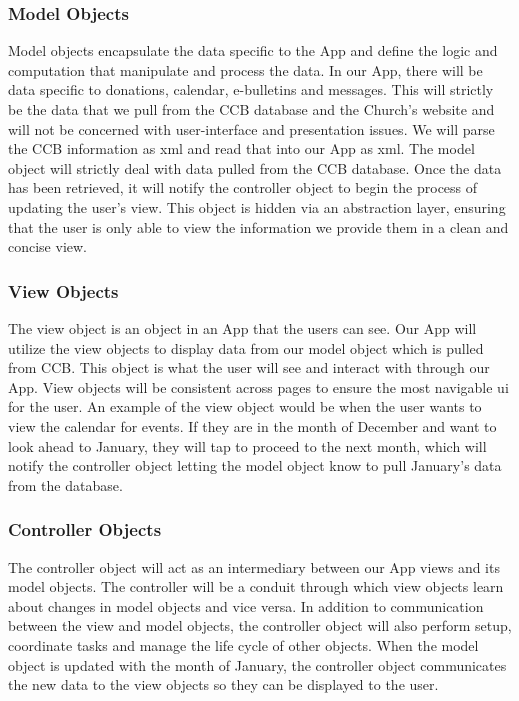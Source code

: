 \documentclass[letterpaper,10pt,draftclsnofoot,onecolumn,titlepage]{IEEEtran}
\begin{document}
			\subsubsection{Model Objects}
				Model objects encapsulate the data specific to the \gls{App} and define the logic and computation that manipulate and process the data.
				In our \gls{App}, there will be data specific to donations, calendar, e-bulletins and messages.
				This will strictly be the data that we pull from the CCB database and the Church's website and will not be concerned with user-interface and presentation issues.
				We will parse the CCB information as \gls{xml} and read that into our \gls{App} as \gls{xml}.
				The model object will strictly deal with data pulled from the CCB database.
				Once the data has been retrieved, it will notify the controller object to begin the process of updating the user's view.
				This object is hidden via an abstraction layer, ensuring that the user is only able to view the information we provide them in a clean and concise view.

			\subsubsection{View Objects}
				The view object is an object in an \gls{App} that the users can see.
				Our \gls{App} will utilize the view objects to display data from our model object which is pulled from CCB.
				This object is what the user will see and interact with through our \gls{App}.
				View objects will be consistent across pages to ensure the most navigable \gls{ui} for the user.
				An example of the view object would be when the user wants to view the calendar for events.
				If they are in the month of December and want to look ahead to January, they will tap to proceed to the next month, which will notify the controller object letting the model object know to pull January's data from the database.

			\subsubsection{Controller Objects}
				The controller object will act as an intermediary between our \gls{App} views and its model objects.
				The controller will be a conduit through which view objects learn about changes in model objects and vice versa.
				In addition to communication between the view and model objects, the controller object will also perform setup, coordinate tasks and manage the life cycle of other objects.
				When the model object is updated with the month of January, the controller object communicates the new data to the view objects so they can be displayed to the user.
\end{document}
